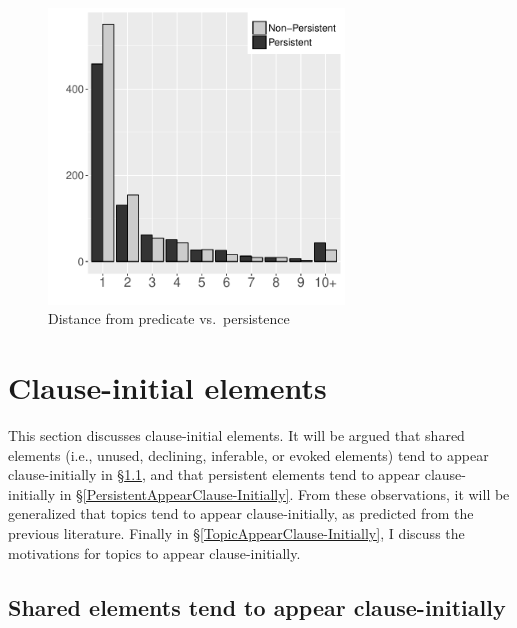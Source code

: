 \begin{figure}
	\includegraphics[width=0.7\textwidth]{figure/DiffPersistence.pdf}
	\caption{Distance from predicate vs.\ persistence}
	\label{DiffPerF}
\end{figure}

\section{Clause-initial elements}\label{WOSentInitEles}

This section discusses clause-initial elements.
It will be argued that shared elements (i.e., unused, declining, inferable, or evoked elements) tend to appear clause-initially
in \S \ref{GivenAppearClause-Initially},
and that
persistent elements tend to appear clause-initially
in \S \ref{PersistentAppearClause-Initially}.
From these observations,
it will be generalized that topics tend to appear clause-initially,
as predicted from the previous literature.
Finally in \S \ref{TopicAppearClause-Initially},
I discuss the motivations for topics to appear clause-initially.


\subsection{Shared elements tend to appear clause-initially}\label{GivenAppearClause-Initially}

